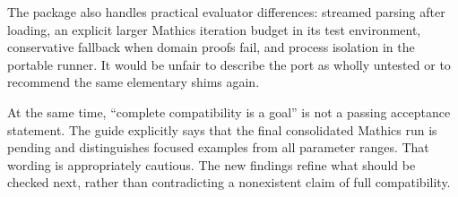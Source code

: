 \documentclass[11pt,a4paper]{article}
\begin{document}
The package also handles practical evaluator differences: streamed parsing after loading, an explicit larger Mathics iteration budget in its test environment, conservative fallback when domain proofs fail, and process isolation in the portable runner. It would be unfair to describe the port as wholly untested or to recommend the same elementary shims again.\cite{mathicsguide,runner}

At the same time, ``complete compatibility is a goal'' is not a passing acceptance statement. The guide explicitly says that the final consolidated Mathics run is pending and distinguishes focused examples from all parameter ranges. That wording is appropriately cautious. The new findings refine what should be checked next, rather than contradicting a nonexistent claim of full compatibility.\cite{mathicsguide}
\end{document}
